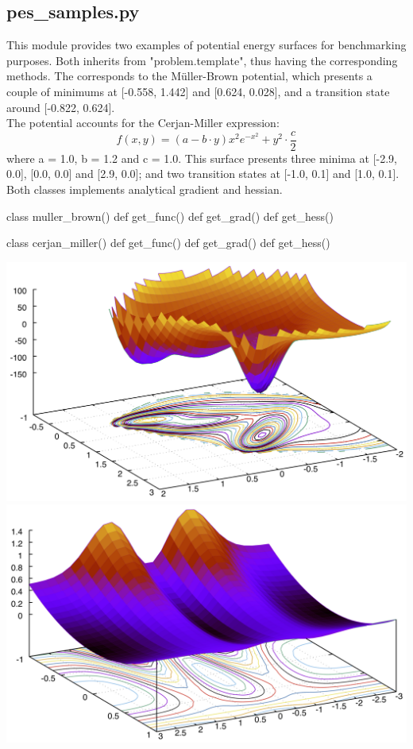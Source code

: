 \normalsize
\subsection[pes\_samples]{pes\_samples.py}
This module provides two examples of potential energy surfaces for benchmarking purposes. Both inherits from
"problem.tem\-plate", thus having the corresponding  methods. The  corresponds
to the M\"uller-Brown potential, which presents a couple of minimums at [-0.558, 1.442] and [0.624, 0.028], 
and a transition state around [-0.822, 0.624].\\
The  potential accounts for the Cerjan-Miller expression:
\begin{equation*}
f(x,y) = \left( a - b \cdot y \right) x^2 e^{-x^2} + y^2\cdot \frac{c}{2}
\end{equation*}
where a = 1.0, b = 1.2 and c = 1.0.
This surface presents three minima at [-2.9, 0.0], [0.0, 0.0] and [2.9, 0.0]; and two transition states at [-1.0, 0.1] and [1.0, 0.1].
\\
Both classes implements analytical gradient and hessian.
\begin{pyglist}[language=python,fvset={frame=single}]
class muller_brown()
    def get_func()
    def get_grad()
    def get_hess()

class cerjan_miller()
    def get_func()
    def get_grad()
    def get_hess()
\end{pyglist}
\includegraphics[width=.5\textwidth]{12.png}
\includegraphics[width=.5\textwidth]{13.png}
